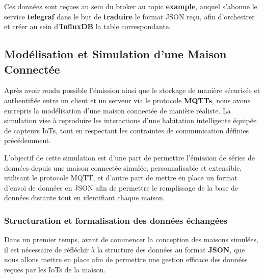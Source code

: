 \documentclass[10pt, a4paper]{report}
\begin{document}
	Ces données sont reçues au sein du broker au topic \textbf{example}, auquel s'abonne le service \textbf{telegraf} dans le but de \textbf{traduire} le format JSON reçu, afin d'orchestrer et créer au sein d'\textbf{InfluxDB} la table correspondante.
	

	
	\subsection{Modélisation et Simulation d'une Maison Connectée}
	Après avoir rendu possible l'émission ainsi que le stockage de manière sécurisée et authentifiée entre un client et un serveur via le protocole \textbf{MQTTs}, nous avons entrepris la modélisation d'une maison connectée de manière réaliste. La simulation vise à reproduire les interactions d'une habitation intelligente équipée de capteurs IoTs, tout en respectant les contraintes de communication définies précédemment.
	
	L'objectif de cette simulation est d'une part de permettre l'émission de séries de données depuis une maison connectée simulée, personnalisable et extensible, utilisant le protocole MQTT, et d'autre part de mettre en place un format d'envoi de données en JSON afin de permettre le remplissage de la base de données distante tout en identifiant chaque maison. 

	\subsubsection{Structuration et formalisation des données échangées}
	Dans un premier temps, avant de commencer la conception des maisons simulées, il est nécessaire de réfléchir à la structure des données au format \textbf{JSON}, que nous allons mettre en place afin de permettre une gestion efficace des données reçues par les IoTs de la maison.
	
\end{document}
